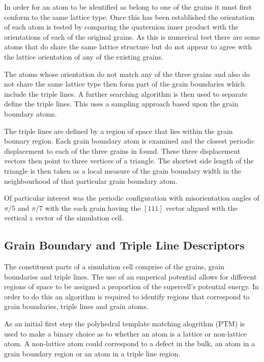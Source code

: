 \documentclass[12pt,a4paper]{book}
\begin{document}
In order for an atom to be identified as belong to one of the grains it must first conform to the same lattice type. Once this has been established the orientation of each atom is tested by comparing the quaternion inner product with the orientations of each of the original grains. As this is numerical test there are some atoms that do share the same lattice structure but do not appear to agree with the lattice orientation of any of the existing grains. 

The atoms whose orientation do not match any of the three grains and also do not share the same lattice type then form part of the grain boundaries which include the triple lines. A further searching algorithm is then used to separate define the triple lines. This uses a sampling approach based upon the grain boundary atoms. 

The triple lines are defined by a region of space that lies within the grain bounary region. Each grain boundary atom is examined and the closest periodic displacement to each of the three grains in found. These three displacement vectors then point to three vertices of a triangle. The shortest side length of the triangle is then taken as a local measure of the grain boundary width in the neighbourhood of that particular grain boundary atom.  

Of particular interest was the periodic configuration with misorientation angles of $\pi/5$ and $\pi/7$ with the each grain having the $[1 1 1]$ vector aligned with the vertical $z$ vector of the simulation cell.

\subsection{Grain Boundary and Triple Line Descriptors}

The constituent parts of a simulation cell comprise of the grains, grain boundaries and triple lines. The use of an emperical potential allows for different regions of space to be assigned a proportion of the supercell's potential energy. In order to do this an algorithm is required to identify regions that correspond to grain boundaries, triple lines and grain atoms.

As an initial first step the polyhedral template matching alogrithm (PTM) is used to make a binary choice as to whether an atom is a lattice or non-lattice atom. A non-lattice atom could correspond to a defect in the bulk, an atom in a grain boundary region  or an atom in a triple line region.
\end{document}
